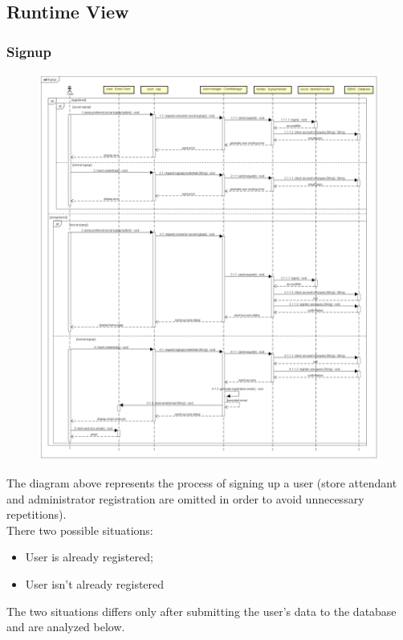 \documentclass[table, 12pt]{article}
\begin{document}
\subsection{Runtime View}
\subsubsection{Signup}
\begin{figure}[H]
    \begin{center}
        \includegraphics[width=\textwidth]{assets/Sequence-Diagram/signup.png}
    \end{center}
\end{figure}
The diagram above represents the process of signing up a user (store attendant and administrator  registration are omitted in order to avoid unnecessary repetitions).\\
There two possible situations:
\begin{itemize}
    \item User is already registered;
    \item User isn't already registered
\end{itemize}
The two situations differs only after submitting the user's data to the database and are analyzed below.\\
\end{document}
